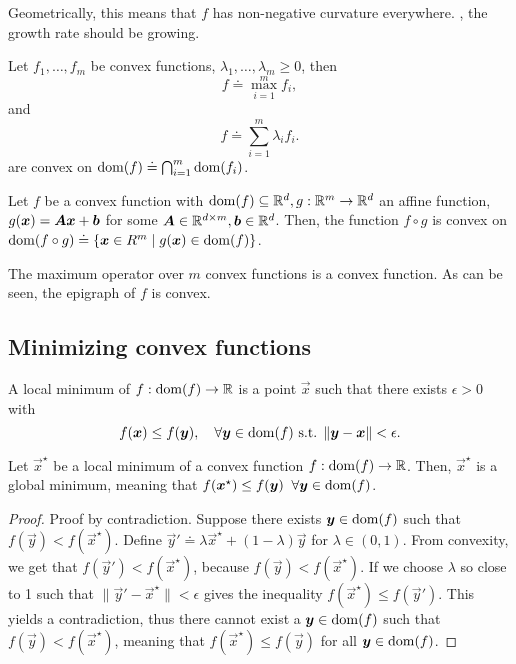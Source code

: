 Geometrically, this means that $f$ has non-negative curvature everywhere. \Ie, the growth rate
should be growing.

\begin{corollary}
    Let $f_1,\ldots,f_m$ be convex functions, $\lambda_1,\ldots,\lambda_m \geq 0$, then \[
        f \doteq \max_{i=1}^m f_i,
    \]
    and \[
        f \doteq \sum_{i=1}^m \lambda_i f_i.
    \]
    are convex on $\mathrm{dom}(f) \doteq \bigcap_{i=1}^m \mathrm{dom}(f_i)$.

    Let $f$ be a convex function with $\mathrm{dom}(f) \subseteq \mathbb{R}^d, g: \mathbb{R}^m \to \mathbb{R}^d$ an affine function,
    \ie $g(\bm{x}) = \bm{A}\bm{x} + \bm{b}$ for some $\bm{A}\in \mathbb{R}^{d\times m},\bm{b}\in \mathbb{R}^d$.
    Then, the function $f \circ g$ is convex on $\mathrm{dom}(f \circ g) \doteq \{ \bm{x}\in R^m \mid
        g(\bm{x}) \in \mathrm{dom}(f) \}$.
\end{corollary}

\begin{marginfigure}
    \centering
    \caption{The maximum operator over $m$ convex functions is a convex function. As can be seen, the epigraph of $f$ is convex.}
    \label{fig:max-convexity}
\end{marginfigure}

\subsection{Minimizing convex functions}

\begin{definition}
    A local minimum of $f: \mathrm{dom}(f) \to \mathbb{R}$ is a point $\vec{x}$ such that there exists $\epsilon > 0$ with \[
        f(\bm{x}) \leq f(\bm{y}), \quad \forall \bm{y} \in \mathrm{dom}(f) \text{ s.t. } \| \bm{y}-\bm{x} \| < \epsilon.
    \]
\end{definition}

\begin{lemma}
    Let $\vec{x}^\star$ be a local minimum of a convex function $f: \mathrm{dom}(f) \to \mathbb{R}$. Then,
    $\vec{x}^\star$ is a global minimum, meaning that
    $f(\bm{x}^\star) \leq f(\bm{y}) \;\; \forall \bm{y} \in \mathrm{dom}(f)$.
\end{lemma}

\begin{proof}
    Proof by contradiction. Suppose there exists $\bm{y}\in\mathrm{dom}(f)$ such that
    $f(\vec{y}) < f(\vec{x}^\star)$. Define $\vec{y}' \doteq \lambda \vec{x}^\star + (1-\lambda) \vec{y}$
    for $\lambda\in(0,1)$. From convexity, we get that $f(\vec{y}') < f(\vec{x}^\star)$, because
    $f(\vec{y}) < f(\vec{x}^\star)$. If we choose $\lambda$ so close to 1 such that
    $\| \vec{y}' - \vec{x}^\star \| < \epsilon$ gives the inequality $f(\vec{x}^\star) \leq f(\vec{y}')$.
    This yields a contradiction, thus there cannot exist a $\bm{y}\in\mathrm{dom}(f)$ such that
    $f(\vec{y}) < f(\vec{x}^\star)$, meaning that $f(\vec{x}^\star) \leq f(\vec{y})$ for all $\bm{y}\in\mathrm{dom}(f)$.
\end{proof}

